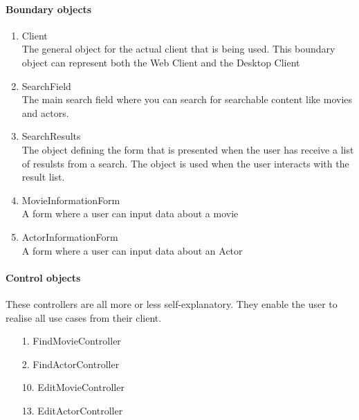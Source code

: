 \paragraph{Boundary objects}

\begin{enumerate}

	\item Client \hfill \\
	The general object for the actual client that is being used. This boundary object can represent both the Web Client and the Desktop Client

	\item SearchField \hfill \\
	The main search field where you can search for searchable content like movies and actors.
	
	\item SearchResults \hfill \\
	The object defining the form that is presented when the user has receive a list of resulsts from a search. The object is used when the user interacts with the result list.
	
	
	\item MovieInformationForm \hfill \\
	A form where a user can input data about a movie
	
	\item ActorInformationForm \hfill \\
	A form where a user can input data about an Actor
	
	
\end{enumerate}

\paragraph{Control objects}

These controllers are all more or less self-explanatory. They enable the user to realise all use cases from their client.

\begin{enumerate}
	\item[1.] FindMovieController
	\item[2.] FindActorController
 	\item[10.] EditMovieController
 	\item[13.] EditActorController
 	
\end{enumerate}


